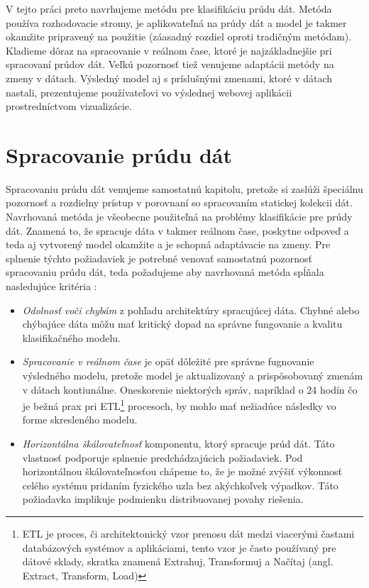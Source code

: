 V tejto práci preto navrhujeme metódu pre klasifikáciu prúdu dát. Metóda používa rozhodovacie stromy, je aplikovateľná na prúdy dát a model je takmer okamžite pripravený na použitie (záasadný rozdiel oproti tradičným metódam). Kladieme dôraz na spracovanie v reálnom čase, ktoré je najzákladnejšie pri spracovaní prúdov dát. Veľkú pozornosť tiež venujeme adaptácii metódy na zmeny v dátach. Výsledný model aj s príslušnými zmenami, ktoré v dátach nastali, prezentujeme používateľovi vo výslednej webovej aplikácii prostredníctvom vizualizácie.


\section{Spracovanie prúdu dát}
\label{method-spracovanie-prudu-dat}

Spracovaniu prúdu dát venujeme samostatnú kapitolu, pretože si zaslúži špeciálnu pozornosť a rozdielny prístup v porovnaní so spracovaním statickej kolekcii dát. Navrhovaná metóda je všeobecne použiteľná na problémy klasifikácie pre prúdy dát. Znamená to, že spracuje dáta v takmer reálnom čase, poskytne odpoveď a teda aj vytvorený model okamžite a je schopná adaptávacie na zmeny. Pre splnenie týchto požiadaviek je potrebné venovať samostatnú pozornosť spracovaniu prúdu dát, teda požadujeme aby navrhovaná metóda spĺňala nasledujúce kritéria \citep{cimerman2015prudy}:
\begin{itemize}
	\item \textit{Odolnosť voči chybám} z pohľadu architektúry spracujúcej dáta. Chybné alebo chýbajúce dáta môžu mať kritický dopad na správne fungovanie a kvalitu klasifikačného modelu.
	\item \textit{Spracovanie v reálnom čase} je opäť dôležité pre správne fugnovanie výsledného modelu, pretože model je aktualizovaný a prispôsobovaný zmenám v dátach kontiunálne. Oneskorenie niektorých správ, napríklad o 24 hodín čo je bežná prax pri ETL\footnote{ETL je proces, či architektonický vzor prenosu dát medzi viacerými častami databázových systémov  a aplikáciami, tento vzor je často používaný pre dátové sklady, skratka znamená Extrahuj, Transformuj a Načítaj (angl. Extract, Transform, Load)} procesoch, by mohlo mať nežiadúce následky vo forme skresleného modelu.
	\item \textit{Horizontálna škálovateľnosť} komponentu, ktorý spracuje prúd dát. Táto vlastnosť podporuje splnenie predchádzajúcich požiadaviek. Pod horizontálnou škálovateľnosťou chápeme to, že je možné zvýšiť výkonnosť celého systému pridaním fyzického uzla bez akýchkoľvek výpadkov. Táto požiadavka implikuje podmienku distribuovanej povahy riešenia.
\end{itemize}

